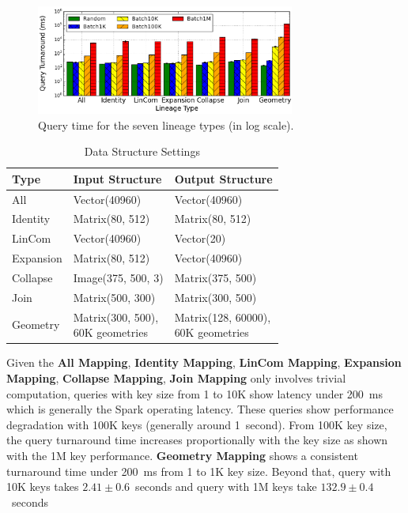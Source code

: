 \documentclass{sig-alternate}
\begin{document}
\begin{figure}[h]
\begin{center}
    \includegraphics[width=85mm]{pictures/TypeQuery-Time}
\caption {Query time for the seven lineage types (in log scale).
    \label{fig:typequery}
}
\end{center}
\end{figure}

\begin{table}[ht]
\begin{center}
    \caption{Data Structure Settings}
    \begin{scriptsize}
    \begin{tabular}{ | p{1.5cm} | p{3cm} | p{3cm} |}
    \hline
    Type & Input Structure & Output Structure \\ \hline \hline
    All & Vector(40960) & Vector(40960) \\ \hline
    Identity & Matrix(80, 512) & Matrix(80, 512) \\ \hline
    LinCom & Vector(40960) & Vector(20) \\ \hline
    Expansion & Matrix(80, 512) & Vector(40960) \\ \hline
    Collapse & Image(375, 500, 3) & Matrix(375, 500) \\ \hline
    Join & Matrix(500, 300) & Matrix(300, 500) \\ \hline
    Geometry& \shortstack[l]{Matrix(300, 500), \\60K geometries} &  \shortstack[l]{Matrix(128, 60000), \\60K geometries} \\ \hline
    \end{tabular}
    \end{scriptsize}
    \label{tb:typequery-stats}
\end{center}   
\end{table}

Given the {\bf All Mapping}, {\bf Identity Mapping}, {\bf LinCom Mapping}, {\bf Expansion Mapping}, {\bf Collapse Mapping}, {\bf Join Mapping}
only involves trivial computation, queries with key size from 1 to 10K show latency under 200~ms which is generally the Spark operating latency. 
These queries show performance degradation with 100K keys (generally around 1~second). 
From 100K key size, the query turnaround time increases proportionally with the key size as shown with the 1M key performance.
{\bf Geometry Mapping} shows a consistent turnaround time under 200~ms from 1 to 1K key size. 
Beyond that, query with 10K keys takes $2.41\pm0.6$~seconds and query with 1M keys take $132.9\pm0.4$~seconds
\end{document}
